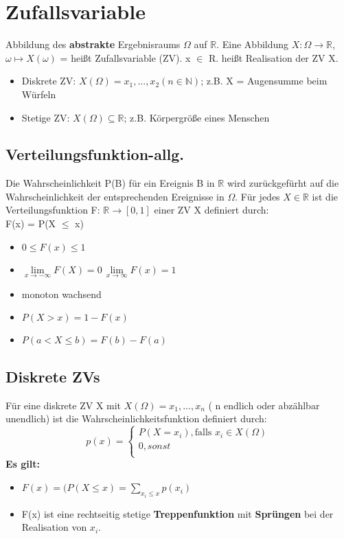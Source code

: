 \section{Zufallsvariable}
Abbildung des \textbf{abstrakte} Ergebnisraums $\Omega$ auf $\mathbb{R}$.
Eine Abbildung $X: \Omega \rightarrow \mathbb{R}$, $\omega \mapsto X(\omega)$ = heißt Zufallsvariable (ZV). x $\in$ R. heißt Realisation der ZV X.
  \begin{itemize}
    \item Diskrete ZV: $X(\Omega) = {x_{1}, ..., x_{2}} (n \in \mathbb{N})$; z.B. X = \dq Augensumme beim Würfeln \dq
    \item Stetige ZV: $X(\Omega) \subseteq \mathbb{R}$; \dq z.B. Körpergröße eines Menschen\dq
  \end{itemize}
\subsection{Verteilungsfunktion-allg.}
Die Wahrscheinlichkeit P(B) für ein Ereignis B in $\mathbb{R}$ wird zurückgefürht auf die Wahrscheinlichkeit der entsprechenden Ereignisse in $\Omega$. Für jedes $X \in \mathbb{R}$  ist die Verteilungsfunktion F: $\mathbb{R} \rightarrow [0,1]$ einer ZV X definiert durch:\\
	F(x) = P(X $\leq$ x)
\begin{itemize}
	\item $0 \leq F(x) \leq 1$
	\item $\lim\limits_{x\to-\infty} F(X)= 0 \, \lim\limits_{x\to\infty} F(x) = 1$
	\item monoton wachsend
	\item $P(X > x) = 1 - F(x)$
	\item $P(a < X \leq b) = F(b) - F(a)$
\end{itemize}
\subsection{Diskrete ZVs}
Für eine diskrete ZV X mit $X(\Omega) = {x_{1}, ..., x_{n}}$ ( n endlich oder abzählbar unendlich) ist die Wahrscheinlichkeitsfunktion definiert durch:\\
\begin{equation}
p(x) =
\begin{cases}
	P(X = x_{i}), \text{falls } x_{i} \in X(\Omega )\\
	0, sonst\\
\end{cases}
\end{equation}
\textbf{Es gilt:}
\begin{itemize}
	\item $F(x) = (P(X \leq x) = \sum_{x_{i}\leq x} p(x_{i})$
	\item F(x) ist eine rechtseitig stetige \textbf{Treppenfunktion} mit \textbf{Sprüngen} bei der Realisation von $x_{i}$.
\end{itemize}
